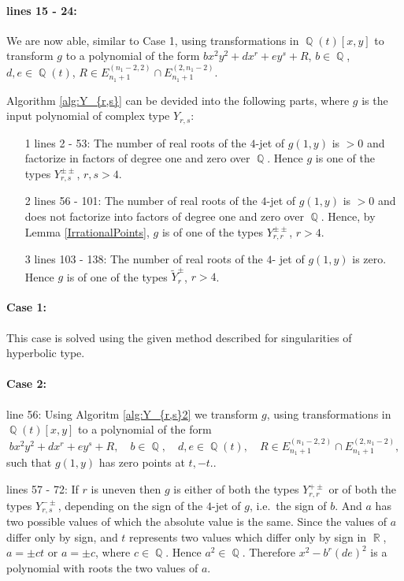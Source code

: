 \documentclass[noend]{amsproc}
\theoremstyle{definition}
\DeclareMathOperator{\Q}{\mathbb{Q}}
\DeclareMathOperator{\R}{\mathbb{R}}
\begin{document}
\paragraph{ lines 15 - 24:} We are now able, similar to Case 1, using transformations in $\Q(t)[x,y]$ to transform $g$ to a polynomial of the form $bx^2y^2+dx^r+ey^s+R$, $b\in\Q$, $d,e\in\Q(t)$, $R\in E_{n_1+1}^{(n_1-2,2)}\cap E_{n_1+1}^{(2,n_1-2)}$.

Algorithm \ref{alg:Y_{r,s}} can be devided into the following parts, where $g$ is the input polynomial of complex type $Y_{r,s}$:

\begin{itemize}
\item[1]lines 2 - 53: The number of real roots of the $4$-jet of $g(1,y)$ is $>0$ and factorize in factors of degree one and zero over $\Q$. Hence $g$ is one of the types $Y_{r,s}^{\pm\pm}$, $r,s>4$.

\item[2]lines 56 - 101: The number of real roots of the $4$-jet of $g(1,y)$ is $>0$ and does not factorize into factors of degree one and zero over $\Q$. Hence, by Lemma \ref{IrrationalPoints}, $g$ is of one of the types $Y_{r,r}^{\pm\pm}$, $r>4$.

\item[3]lines 103 - 138: The number of real roots of the $4$- jet of $g(1,y)$ is zero. Hence $g$ is of one of the types $\widetilde Y_r^{\pm}$, $r>4$.
\end{itemize} 

\paragraph{Case 1:} This case is solved using the given method described for singularities of hyperbolic type.

\paragraph{Case 2:} line 56: Using Algoritm \ref{alg:Y_{r,s}2} we transform $g$, using transformations in $\Q(t)[x,y]$ to a polynomial of the form \[bx^2y^2+dx^r+ey^s+R, \quad b\in\Q,\quad d,e\in\Q(t),\quad R\in E_{n_1+1}^{(n_1-2,2)}\cap E_{n_1+1}^{(2,n_1-2)},\]such that $g(1,y)$ has zero points at $t, -t$..

lines 57 - 72: If $r$ is uneven then $g$ is either of both the types $Y_{r,r}^{+\pm}$ or of both the types $Y_{r,s}^{-\pm}$, depending on the sign of the $4$-jet of $g$, i.e.~the sign of $b$. And $a$ has two possible values of which the absolute value is the same. Since the values of $a$ differ only by sign, and $t$ represents two values which differ only by sign in $\R$, $a=\pm ct$ or $a=\pm c$, where $c\in \Q$. Hence $a^2\in\Q$. Therefore $x^2-b^r(de)^2$ is a polynomial with roots the two values of $a$.
\end{document}
